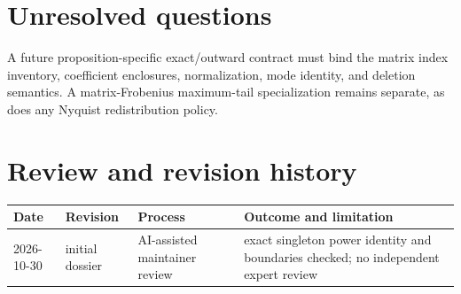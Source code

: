 \documentclass[11pt]{article}
\begin{document}
\section{Unresolved questions}
A future proposition-specific exact/outward contract must bind the matrix index inventory,
coefficient enclosures, normalization, mode identity, and deletion semantics.  A matrix-Frobenius
maximum-tail specialization remains separate, as does any Nyquist redistribution policy.

\section{Review and revision history}
\begin{tabularx}{\textwidth}{@{}lllX@{}}
\toprule
Date & Revision & Process & Outcome and limitation \\
\midrule
2026-10-30 & initial dossier & AI-assisted maintainer review & exact singleton power identity and boundaries checked; no independent expert review \\
\bottomrule
\end{tabularx}
\end{document}
